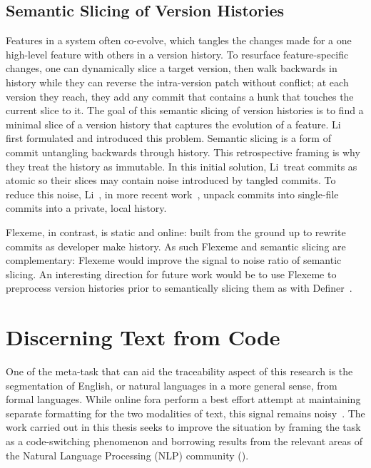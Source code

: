 \subsection{Semantic Slicing of Version Histories}
\label{chapter:literature:sec:flexeme_rel_work:sem_slice_vh}

Features in a system often co-evolve, which tangles the changes made for a one
high-level feature with others in a version history. To resurface
feature-specific changes, one can dynamically slice a target version, then walk
backwards in history while they can reverse the intra-version patch without
conflict; at each version they reach, they add any commit that contains a hunk
that touches the current slice to it. The goal of this semantic slicing of
version histories is to find a minimal slice of a version history that captures
the evolution of a feature. Li~\etal~\cite{Li2018, li2015semantic} first
formulated and introduced this problem. Semantic slicing is a form of commit
untangling backwards through history.  This retrospective framing is why they
treat the history as immutable. In this initial solution, Li~\etal treat commits
as atomic so their slices may contain noise introduced by tangled commits. To
reduce this noise, Li~\etal, in more recent work~\cite{Li2019}, unpack commits
into single-file commits into a private, local history.

Flexeme, in contrast, is static and online:  built from the ground up to rewrite
commits as developer make history.  
As such Flexeme and semantic slicing are complementary:  Flexeme would improve
the signal to noise ratio of semantic slicing. An interesting direction for
future work would be to use Flexeme to preprocess version histories prior to
semantically slicing them as with Definer~\cite{Li2019}.

\section{Discerning Text from Code}
\label{chapter:literature:sec:posit_rel_work}

One of the meta-task that can aid the traceability aspect of this research is
the segmentation of English, or natural languages in a more general sense, from
formal languages. While online fora perform a best effort attempt at maintaining
separate formatting for the two modalities of text, this signal remains
noisy~\cite{ponzanelli2014improving}. The work carried out in this thesis seeks
to improve the situation by framing the task as a code-switching phenomenon and
borrowing results from the relevant areas of the Natural Language Processing
(NLP) community ().

